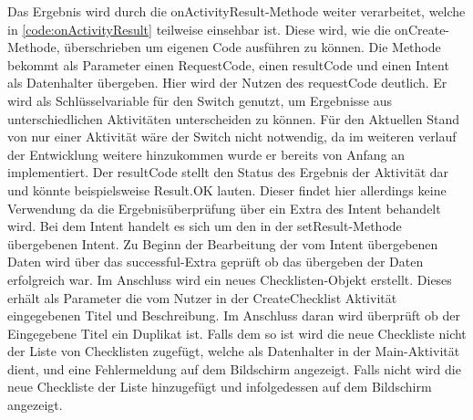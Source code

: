 Das Ergebnis wird durch die onActivityResult-Methode weiter verarbeitet, welche in \autoref{code:onActivityResult} teilweise einsehbar ist. Diese wird, wie die onCreate-Methode, überschrieben um eigenen Code ausführen zu können. Die Methode bekommt als Parameter einen RequestCode, einen resultCode und einen Intent als Datenhalter übergeben. Hier wird der Nutzen des requestCode deutlich. Er wird als Schlüsselvariable für den Switch genutzt, um Ergebnisse aus unterschiedlichen Aktivitäten unterscheiden zu können. Für den Aktuellen Stand von nur einer Aktivität wäre der Switch nicht notwendig, da im weiteren verlauf der Entwicklung weitere hinzukommen wurde er bereits von Anfang an implementiert. Der resultCode stellt den Status des Ergebnis der Aktivität dar und könnte beispielsweise Result.OK lauten. Dieser findet hier allerdings keine Verwendung da die Ergebnisüberprüfung über ein Extra des Intent behandelt wird. Bei dem Intent handelt es sich um den in der setResult-Methode übergebenen Intent. Zu Beginn der Bearbeitung der vom Intent übergebenen Daten wird über das \glqq successful\grqq{}-Extra geprüft ob das übergeben der Daten erfolgreich war. Im Anschluss wird ein neues Checklisten-Objekt erstellt. Dieses erhält als Parameter die vom Nutzer in der CreateChecklist Aktivität eingegebenen Titel und Beschreibung. Im Anschluss daran wird überprüft ob der Eingegebene Titel ein Duplikat ist. Falls dem so ist wird die neue Checkliste nicht der Liste von Checklisten zugefügt, welche als Datenhalter in der Main-Aktivität dient, und eine Fehlermeldung auf dem Bildschirm angezeigt. Falls nicht wird die neue Checkliste der Liste hinzugefügt und infolgedessen auf dem Bildschirm angezeigt.
\\




